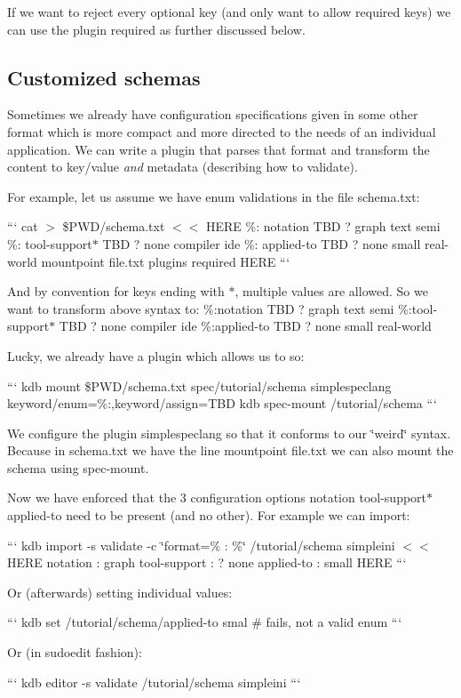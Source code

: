 If we want to reject every optional key (and only want to allow required keys) we can use the plugin {\ttfamily required} as further discussed below.

\subsection*{Customized schemas}

Sometimes we already have configuration specifications given in some other format which is more compact and more directed to the needs of an individual application. We can write a plugin that parses that format and transform the content to key/value {\itshape and} metadata (describing how to validate).

For example, let us assume we have enum validations in the file {\ttfamily schema.\+txt}\+:

``` cat $>$ \$\+P\+W\+D/schema.txt $<$$<$ H\+E\+R\+E \%\+: notation T\+B\+D ? graph text semi \%\+: tool-\/support$\ast$ T\+B\+D ? none compiler ide \%\+: applied-\/to T\+B\+D ? none small real-\/world mountpoint file.\+txt plugins required H\+E\+R\+E ```

And by convention for keys ending with {\ttfamily $\ast$}, multiple values are allowed. So we want to transform above syntax to\+: \%\+:notation T\+B\+D ? graph text semi \%\+:tool-\/support$\ast$ T\+B\+D ? none compiler ide \%\+:applied-\/to T\+B\+D ? none small real-\/world

Lucky, we already have a plugin which allows us to so\+:

``` kdb mount \$\+P\+W\+D/schema.txt spec/tutorial/schema simplespeclang keyword/enum=\%\+:,keyword/assign=T\+B\+D kdb spec-\/mount /tutorial/schema ```

We configure the plugin {\ttfamily simplespeclang} so that it conforms to our \char`\"{}weird\char`\"{} syntax. Because in {\ttfamily schema.\+txt} we have the line {\ttfamily mountpoint file.\+txt} we can also mount the schema using {\ttfamily spec-\/mount}.

Now we have enforced that the 3 configuration options {\ttfamily notation tool-\/support$\ast$ applied-\/to} need to be present (and no other). For example we can import\+:

``` kdb import -\/s validate -\/c \char`\"{}format=\% \+: \%\char`\"{} /tutorial/schema simpleini $<$$<$ H\+E\+R\+E notation \+: graph tool-\/support \+: ? none applied-\/to \+: small H\+E\+R\+E ```

Or (afterwards) setting individual values\+:

``` kdb set /tutorial/schema/applied-\/to smal \# fails, not a valid enum ```

Or (in {\ttfamily sudoedit} fashion)\+:

``` kdb editor -\/s validate /tutorial/schema simpleini ``` 